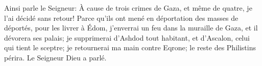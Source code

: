 Ainsi parle le Seigneur:
	À cause de trois crimes de Gaza, et même de quatre, je l’ai décidé sans retour!
Parce qu’ils ont mené en déportation des masses de déportés, pour les livrer à Édom,
	j’enverrai un feu dans la muraille de Gaza, et il dévorera ses palais;
	je supprimerai d’Ashdod tout habitant, et d’Ascalon, celui qui tient le sceptre;
	je retournerai ma main contre Eqrone; le reste des Philistins périra.
Le Seigneur Dieu a parlé.
